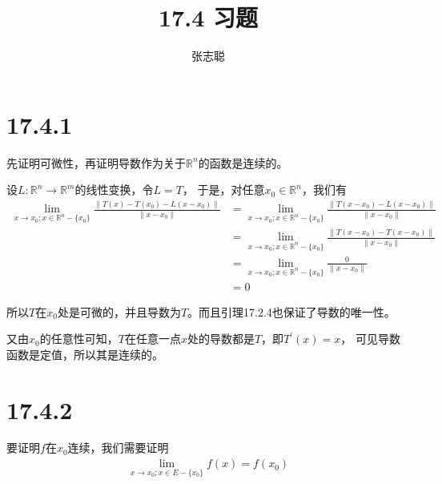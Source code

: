 \documentclass{article}
\begin{document}
\title{17.4 习题}
\author{张志聪}
\maketitle

\section*{17.4.1}

先证明可微性，再证明导数作为关于$\mathbb{R}^n$的函数是连续的。

设$L : \mathbb{R}^n \to \mathbb{R}^m$的线性变换，令$L = T$，
于是，对任意$x_0 \in \mathbb{R}^n$，我们有
\begin{align*}
  \lim\limits_{x \to x_0; x \in \mathbb{R}^n - \{x_0\} } \frac{\|T(x) - T(x_0) - L(x - x_0) \|}{\|x - x_0\|}
   & = \lim\limits_{x \to x_0; x \in \mathbb{R}^n - \{x_0\} } \frac{\|T(x - x_0) - L(x - x_0) \|}{\|x - x_0\|} \\
   & = \lim\limits_{x \to x_0; x \in \mathbb{R}^n - \{x_0\} } \frac{\|T(x - x_0) - T(x - x_0) \|}{\|x - x_0\|} \\
   & = \lim\limits_{x \to x_0; x \in \mathbb{R}^n - \{x_0\} } \frac{0}{\|x - x_0\|}                            \\
   & = 0
\end{align*}

所以$T$在$x_0$处是可微的，并且导数为$T$。而且引理17.2.4也保证了导数的唯一性。

又由$x_0$的任意性可知，$T$在任意一点$x$处的导数都是$T$，即$T^\prime(x) = x$，
可见导数函数是定值，所以其是连续的。

\section*{17.4.2}

要证明$f$在$x_0$连续，我们需要证明
\begin{align*}
  \lim\limits_{x \to x_0; x \in E - \{x_0\} } f(x) = f(x_0)
\end{align*}
\end{document}
